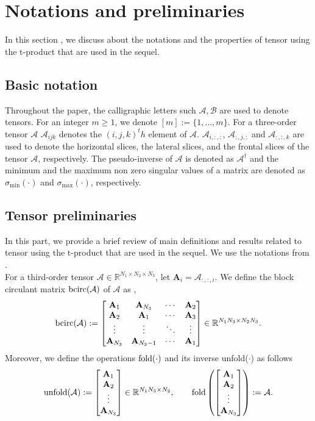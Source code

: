 \documentclass[11pt]{article}
\def\fm#1{\mathcal{#1}}
\def\m#1{\boldsymbol{#1}}
\def\r{\mathbb{R}}
\begin{document}
   
\section{Notations and preliminaries} \label{sec:prelim}
In this section , we discuss about the notations and the properties of tensor using the t-product that are  used in the sequel.
\subsection{Basic notation}
Throughout the paper,  the calligraphic letters such $\fm A, \fm B$ are used  to denote tensors. For an integer $m\geq 1$, we denote $[m]:=\{1, \ldots, m \}$. For a three-order tensor $\fm A$  $\fm A_{ijk}$ denotes the $(i, j,k)^th$ element of $\fm A$. $\fm A_{i, :, :}$, $\fm A_{:, j, :}$ and $\fm A_{:, :, k}$ are used to denote the horizontal slices, the lateral slices, and the frontal slices of the tensor $\fm A$, respectively. The pseudo-inverse of $\fm A$ is denoted as $\fm A^\dagger$ and the minimum and the maximum non zero singular values of a matrix are denoted as $\sigma_{\min}(\cdot)$ and $\sigma_{\max}(\cdot)$, respectively.


\subsection{Tensor preliminaries}
In this part, we provide  a brief review of main  definitions and results related to tensor using the t-product that are used in the sequel.  We use the notations from \cite{kilmer2011facto, kilmer2013thirdOrder}.\\
For a third-order tensor $\fm A\in \r^{N_1\times N_2\times N_3}$, let $\m A_i = \fm A_{:, :, i}$. We define the block circulant matrix  $\bcirc(\fm A)$  of $\fm A$ as ,
$$
    {\rm bcirc}(\mathcal A):=\begin{bmatrix}\mathbf A_1 &\mathbf A_{N_3} & \cdots & \mathbf A_2\\ \mathbf A_2 & \mathbf A_1 & \cdots &\mathbf A_3\\ \vdots &\vdots & \ddots &\vdots\\ \mathbf A_{N_3}& \mathbf A_{N_3-1}& \cdots &\mathbf A_1\end{bmatrix}\in\mathbb R^{N_1N_3\times N_2N_3}.
$$
Moreover, we define the operations ${\rm fold}(\cdot)$  and its inverse unfold($\cdot$) as follows
$$
{\rm unfold}(\mathcal A):=\begin{bmatrix}\mathbf A_1\\ \mathbf A_2\\ \vdots\\ \mathbf A_{N_3}\end{bmatrix}\in\mathbb R^{N_1N_3\times N_2},\qquad {\rm fold}\left(\begin{bmatrix}\mathbf A_1\\ \mathbf A_2\\ \vdots\\ \mathbf A_{N_3}\end{bmatrix}\right):=\mathcal A.
$$ 
\end{document}
